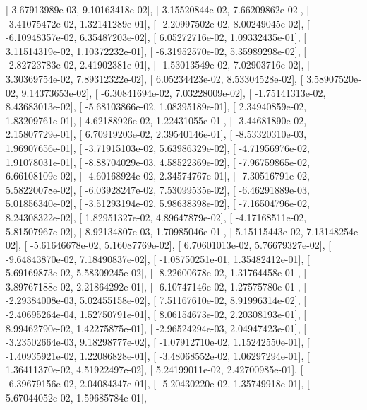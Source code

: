 \documentclass{article}
\begin{document}
       [  3.67913989e-03,   9.10163418e-02],
       [  3.15520844e-02,   7.66209862e-02],
       [ -3.41075472e-02,   1.32141289e-01],
       [ -2.20997502e-02,   8.00249045e-02],
       [ -6.10948357e-02,   6.35487203e-02],
       [  6.05272716e-02,   1.09332435e-01],
       [  3.11514319e-02,   1.10372232e-01],
       [ -6.31952570e-02,   5.35989298e-02],
       [ -2.82723783e-02,   2.41902381e-01],
       [ -1.53013549e-02,   7.02903716e-02],
       [  3.30369754e-02,   7.89312322e-02],
       [  6.05234423e-02,   8.53304528e-02],
       [  3.58907520e-02,   9.14373653e-02],
       [ -6.30841694e-02,   7.03228009e-02],
       [ -1.75141313e-02,   8.43683013e-02],
       [ -5.68103866e-02,   1.08395189e-01],
       [  2.34940859e-02,   1.83209761e-01],
       [  4.62188926e-02,   1.22431055e-01],
       [ -3.44681890e-02,   2.15807729e-01],
       [  6.70919203e-02,   2.39540146e-01],
       [ -8.53320310e-03,   1.96907656e-01],
       [ -3.71915103e-02,   5.63986329e-02],
       [ -4.71956976e-02,   1.91078031e-01],
       [ -8.88704029e-03,   4.58522369e-02],
       [ -7.96759865e-02,   6.66108109e-02],
       [ -4.60168924e-02,   2.34574767e-01],
       [ -7.30516791e-02,   5.58220078e-02],
       [ -6.03928247e-02,   7.53099535e-02],
       [ -6.46291889e-03,   5.01856340e-02],
       [ -3.51293194e-02,   5.98638398e-02],
       [ -7.16504796e-02,   8.24308322e-02],
       [  1.82951327e-02,   4.89647879e-02],
       [ -4.17168511e-02,   5.81507967e-02],
       [  8.92134807e-03,   1.70985046e-01],
       [  5.15115443e-02,   7.13148254e-02],
       [ -5.61646678e-02,   5.16087769e-02],
       [  6.70601013e-02,   5.76679327e-02],
       [ -9.64843870e-02,   7.18490837e-02],
       [ -1.08750251e-01,   1.35482412e-01],
       [  5.69169873e-02,   5.58309245e-02],
       [ -8.22600678e-02,   1.31764458e-01],
       [  3.89767188e-02,   2.21864292e-01],
       [ -6.10747146e-02,   1.27575780e-01],
       [ -2.29384008e-03,   5.02455158e-02],
       [  7.51167610e-02,   8.91996314e-02],
       [ -2.40695264e-04,   1.52750791e-01],
       [  8.06154673e-02,   2.20308193e-01],
       [  8.99462790e-02,   1.42275875e-01],
       [ -2.96524294e-03,   2.04947423e-01],
       [ -3.23502664e-03,   9.18298777e-02],
       [ -1.07912710e-02,   1.15242550e-01],
       [ -1.40935921e-02,   1.22086828e-01],
       [ -3.48068552e-02,   1.06297294e-01],
       [  1.36411370e-02,   4.51922497e-02],
       [  5.24199011e-02,   2.42700985e-01],
       [ -6.39679156e-02,   2.04084347e-01],
       [ -5.20430220e-02,   1.35749918e-01],
       [  5.67044052e-02,   1.59685784e-01],
\end{document}
